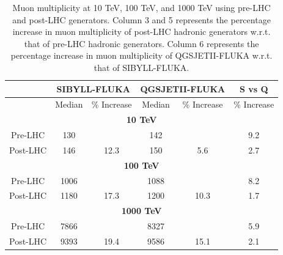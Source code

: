 \documentclass[12pt]{article}
\begin{document}
\begin{table}
\centering
\begin{tabular}{ | c | c | c | c | c | c |} 
\hline
& \multicolumn{2}{|c|}{\textbf{SIBYLL-FLUKA}} & \multicolumn{2}{|c|}{\textbf{QGSJETII-FLUKA}} & S vs Q \\
\hline
 & Median & \% Increase & Median & \% Increase & \% Increase \\
\hline 
\multicolumn{6}{|c|}{\textbf{10 TeV}} \\
\hline
Pre-LHC 	&	130	&	      & 142 &			& 9.2 \\
\hline
Post-LHC 	&	146	&	12.3      & 150 &	5.6		& 2.7 \\
\hline
\multicolumn{6}{|c|}{\textbf{100 TeV}} \\
\hline
Pre-LHC & 1006 &  & 1088 & & 8.2 \\
\hline
Post-LHC & 1180 & 17.3 & 1200 & 10.3 & 1.7 \\
\hline
\multicolumn{6}{|c|}{\textbf{1000 TeV}} \\
\hline
Pre-LHC & 7866 &  & 8327 & & 5.9\\
\hline
Post-LHC & 9393 & 19.4 & 9586 & 15.1 & 2.1\\
\hline
\end{tabular}
\caption{Muon multiplicity at 10 TeV, 100 TeV, and 1000 TeV using pre-LHC and post-LHC generators. Column 3 and 5 represents the percentage increase in muon multiplicity of post-LHC hadronic generators w.r.t. that of pre-LHC hadronic generators. Column 6 represents the percentage increase in muon multiplicity of QGSJETII-FLUKA w.r.t. that of SIBYLL-FLUKA.\label{tab:muon_multiplicity_lhc}}
\end{table}
\end{document}
